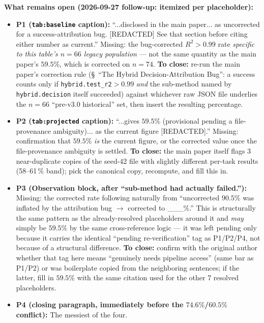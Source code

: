 \documentclass[11pt]{article}
\begin{document}
\textbf{What remains open (2026-09-27 follow-up: itemized per placeholder):}
\begin{itemize}
  \item \textbf{P1 (\texttt{tab:baseline} caption):} ``...disclosed in
    the main paper... as uncorrected for a success-attribution bug.
    [REDACTED] See that section before citing either number as
    current.'' Missing: the bug-corrected $R^2>0.99$ rate
    \emph{specific to this table's $n=66$ legacy population} — not the
    same quantity as the main paper's $59.5\%$, which is corrected on
    $n=74$. \textbf{To close:} re-run the main paper's correction rule
    (\S~``The Hybrid Decision-Attribution Bug'': a success counts only
    if \texttt{hybrid.test\_r2}$>0.99$ \emph{and} the sub-method named
    by \texttt{hybrid.decision} itself succeeded) against whichever raw
    JSON file underlies the $n=66$ ``pre-v3.0 historical'' set, then
    insert the resulting percentage.
  \item \textbf{P2 (\texttt{tab:projected} caption):} ``...gives
    $59.5\%$ (provisional pending a file-provenance ambiguity)... as the
    current figure [REDACTED].'' Missing: confirmation that $59.5\%$
    \emph{is} the current figure, or the corrected value once the
    file-provenance ambiguity is settled. \textbf{To close:} the main
    paper itself flags 3 near-duplicate copies of the seed-42 file with
    slightly different per-task results (58--61\,\% band); pick the
    canonical copy, recompute, and fill this in.
  \item \textbf{P3 (Observation block, after ``sub-method had actually
    failed.''):} Missing: the corrected rate following naturally from
    ``uncorrected $90.5\%$ was inflated by the attribution bug $\to$
    corrected to \_\_\_\%.'' This is structurally the same pattern as
    the already-resolved placeholders around it and \emph{may} simply
    be $59.5\%$ by the same cross-reference logic — it was left pending
    only because it carries the identical ``pending re-verification''
    tag as P1/P2/P4, not because of a structural difference.
    \textbf{To close:} confirm with the original author whether that
    tag here means ``genuinely needs pipeline access'' (same bar as
    P1/P2) or was boilerplate copied from the neighboring sentences; if
    the latter, fill in $59.5\%$ with the same citation used for the
    other 7 resolved placeholders.
  \item \textbf{P4 (closing paragraph, immediately before the
    $74.6\%$/$60.5\%$ conflict):} The messiest of the four.

\end{itemize}
\end{document}
